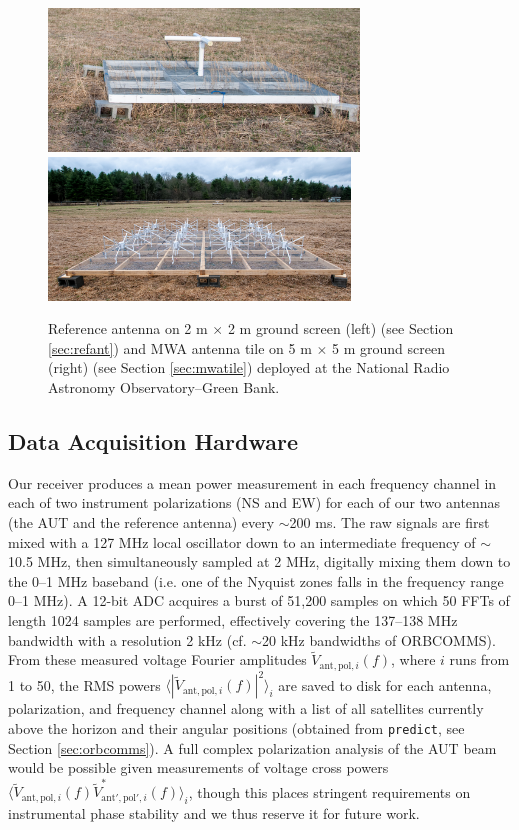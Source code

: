 \begin{figure}
\includegraphics[height=1.5in]{chap1_precision_beammapping_figures/ref_ant.jpg}
\includegraphics[height=1.5in]{chap1_precision_beammapping_figures/apr14tile.jpg}
\caption[Photos of our reference antenna (left) and the MWA tile (right)]{Reference antenna on 2 m $\times$ 2 m ground screen (left) (see Section \ref{sec:refant}) and MWA antenna tile on 5 m $\times$ 5 m ground screen (right) (see Section \ref{sec:mwatile}) deployed at the National Radio Astronomy Observatory--Green Bank.}
\label{fig:antennas} 
\end{figure}

\subsection{Data Acquisition Hardware}
\label{sec:daq}

Our receiver produces a mean power measurement in each frequency channel in each of two instrument polarizations (NS and EW) for each of our two antennas (the AUT and the reference antenna) every $\sim$200 ms. The raw signals are first mixed with a 127 MHz local oscillator down to an intermediate frequency of $\sim$10.5 MHz, then simultaneously sampled at 2 MHz, digitally mixing them down to the 0--1 MHz baseband (i.e. one of the Nyquist zones falls in the frequency range 0--1 MHz).  A 12-bit ADC acquires a burst of 51,200 samples on which 50 FFTs of length 1024 samples are performed, effectively covering the 137--138 MHz bandwidth with a resolution 2 kHz (cf. $\sim$20 kHz bandwidths of ORBCOMMS). From these measured voltage Fourier amplitudes $\widetilde{V}_{\mathrm{ant},\mathrm{pol},i}(f)$, where $i$ runs from 1 to 50, the RMS powers $\langle|\widetilde{V}_{\mathrm{ant},\mathrm{pol},i}(f)|^2\rangle_i$ are saved to disk for each antenna, polarization, and frequency channel along with a list of all satellites currently above the horizon and their angular positions (obtained from {\tt predict}, see Section \ref{sec:orbcomms}). A full complex polarization analysis of the AUT beam would be possible given measurements of voltage cross powers $\langle \widetilde{V}_{\mathrm{ant},\mathrm{pol},i}(f)\widetilde{V}_{\mathrm{ant'},\mathrm{pol'},i}^*(f)\rangle_i$, though this places stringent requirements on instrumental phase stability and we thus reserve it for future work.

